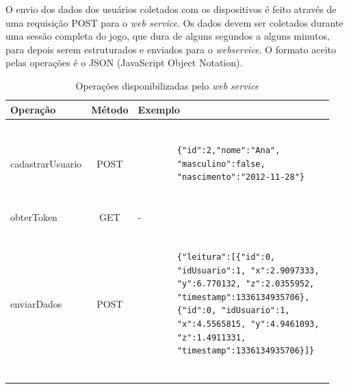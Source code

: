 
O envio dos dados dos usuários coletados com os dispositivos é feito através de uma requisição POST para o \textit{web service}. Os dados devem ser coletados durante uma sessão completa do jogo, que dura de alguns segundos a alguns minutos, para depois serem estruturados e enviados para o \textit{webservice}. O formato aceito pelas operações é o JSON (JavaScript Object Notation). 

\begin{table} 
\centering 
\caption{Operações disponibilizadas pelo \textit{web service}}
\begin{center}
    \begin{tabular}{ | l | c | l | }
        \hline
        Operação & Método & Exemplo \\ \hline
        cadastrarUsuario & POST & 
		\begin{minipage}{7cm}\begin{verbatim}
		
		{"id":2,"nome":"Ana",
		"masculino":false,
		"nascimento":"2012-11-28"}
		
		\end{verbatim}\end{minipage} \\ \hline
        obterToken & GET & - \\ \hline
        enviarDados & POST & 
		\begin{minipage}{7.5cm}\begin{verbatim}

		{"leitura":[{"id":0, 
		"idUsuario":1, "x":2.9097333, 
		"y":6.770132, "z":2.0355952, 
		"timestamp":1336134935706}, 
		{"id":0, "idUsuario":1, 
		"x":4.5565815, "y":4.9461093, 
		"z":1.4911331, 
		"timestamp":1336134935706}]}
		
		\end{verbatim}\end{minipage} \\ \hline
    \end{tabular}
\end{center}
\label{tab:operations}
\end{table}

